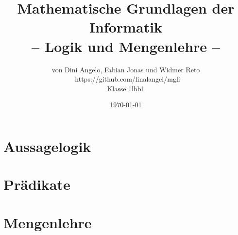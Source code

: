 \documentclass{article}
\title{Mathematische Grundlagen der Informatik \\ – Logik und Mengenlehre –}
\author{von Dini Angelo, Fabian Jonas und Widmer Reto \\ https://github.com/finalangel/mgli \\ Klasse 1lbb1}
\date{\today}
\begin{document}
\maketitle
\vspace{5mm}
\tableofcontents

\newpage


\newpage
\section{Aussagelogik}


\newpage
\section{Prädikate}


\newpage
\section{Mengenlehre}

\end{document}
